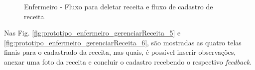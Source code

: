 \begin{figure}[H]
    \centering
    \caption{Enfermeiro - Fluxo para deletar receita e fluxo de cadastro de receita}
\end{figure}

Nas Fig. \ref{fig:prototipo_enfermeiro_gerenciarReceita_5} e \ref{fig:prototipo_enfermeiro_gerenciarReceita_6}, são mostradas as quatro telas finais para o cadastrado da receita, nas quais, é possível inserir observações, anexar uma foto da receita e concluir o cadastro recebendo o respectivo \textit{feedback}.

